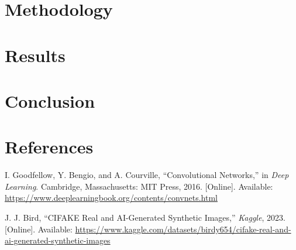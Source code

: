 \documentclass[11pt]{article}
\begin{document}
\section{Methodology}

\blindtext %

\section{Results}
\blindtext %

\section{Conclusion}
\blindtext %

\section{References}
\begin{enumerate}[label={[\arabic*]}]
    \item \label{ref:deeplearning} I. Goodfellow, Y. Bengio, and A. Courville, “Convolutional Networks,” in \textit{Deep Learning}. Cambridge, Massachusetts: MIT Press, 2016. [Online]. Available:  
    \url{https://www.deeplearningbook.org/contents/convnets.html}
    
    \item \label{ref:kaggle} J. J. Bird, “CIFAKE Real and AI-Generated Synthetic Images,” \textit{Kaggle}, 2023. [Online]. Available:  
    \url{https://www.kaggle.com/datasets/birdy654/cifake-real-and-ai-generated-synthetic-images}
\end{enumerate}
\end{document}
